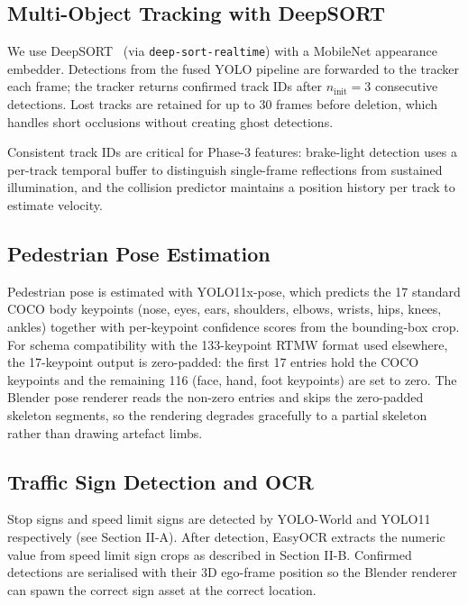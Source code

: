 \documentclass[conference]{IEEEtran}
\begin{document}
\subsection{Multi-Object Tracking with DeepSORT}

We use DeepSORT~\cite{wojke2017deepsort} (via \texttt{deep-sort-realtime})
with a MobileNet appearance embedder.  Detections from the fused YOLO
pipeline are forwarded to the tracker each frame; the tracker returns
confirmed track IDs after $n_{\text{init}} = 3$ consecutive detections.
Lost tracks are retained for up to 30 frames before deletion, which
handles short occlusions without creating ghost detections.

Consistent track IDs are critical for Phase-3 features: brake-light
detection uses a per-track temporal buffer to distinguish single-frame
reflections from sustained illumination, and the collision predictor
maintains a position history per track to estimate velocity.

\subsection{Pedestrian Pose Estimation}

Pedestrian pose is estimated with YOLO11x-pose, which predicts the 17
standard COCO body keypoints (nose, eyes, ears, shoulders, elbows, wrists,
hips, knees, ankles) together with per-keypoint confidence scores from the
bounding-box crop.  For schema compatibility with the 133-keypoint RTMW
format used elsewhere, the 17-keypoint output is zero-padded: the first 17
entries hold the COCO keypoints and the remaining 116 (face, hand, foot
keypoints) are set to zero.  The Blender pose renderer reads the
non-zero entries and skips the zero-padded skeleton segments, so the
rendering degrades gracefully to a partial skeleton rather than
drawing artefact limbs.

\subsection{Traffic Sign Detection and OCR}

Stop signs and speed limit signs are detected by YOLO-World and YOLO11
respectively (see Section II-A).  After detection, EasyOCR extracts the
numeric value from speed limit sign crops as described in Section II-B.
Confirmed detections are serialised with their 3D ego-frame position so
the Blender renderer can spawn the correct sign asset at the correct location.
\end{document}
